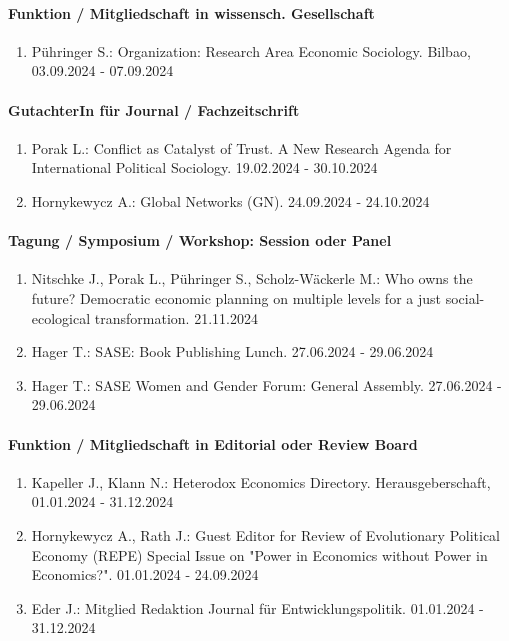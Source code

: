 \paragraph{Funktion / Mitgliedschaft in wissensch. Gesellschaft} 
\begin{enumerate}[leftmargin=*, labelsep=0.5cm] 
 	 \item Pühringer S.: Organization: Research Area Economic Sociology. Bilbao, 03.09.2024 - 07.09.2024 
\end{enumerate} 
\paragraph{GutachterIn für Journal / Fachzeitschrift} 
\begin{enumerate}[leftmargin=*, labelsep=0.5cm] 
 	 \item Porak L.: Conflict as Catalyst of Trust. A New Research Agenda for International Political Sociology. 19.02.2024 - 30.10.2024 
	 \item Hornykewycz A.: Global Networks (GN). 24.09.2024 - 24.10.2024 
\end{enumerate} 
\paragraph{Tagung / Symposium / Workshop: Session oder Panel} 
\begin{enumerate}[leftmargin=*, labelsep=0.5cm] 
 	 \item Nitschke J., Porak L., Pühringer S., Scholz-Wäckerle M.: Who owns the future? Democratic economic planning on multiple levels for a just social-ecological transformation. 21.11.2024 
	 \item Hager T.: SASE: Book Publishing Lunch. 27.06.2024 - 29.06.2024 
	 \item Hager T.: SASE Women and Gender Forum: General Assembly. 27.06.2024 - 29.06.2024 
\end{enumerate} 
\paragraph{Funktion / Mitgliedschaft in Editorial oder Review Board} 
\begin{enumerate}[leftmargin=*, labelsep=0.5cm] 
 	 \item Kapeller J., Klann N.: Heterodox Economics Directory. Herausgeberschaft, 01.01.2024 - 31.12.2024 
	 \item Hornykewycz A., Rath J.: Guest Editor for Review of Evolutionary Political Economy (REPE) Special Issue on "Power in Economics without Power in Economics?". 01.01.2024 - 24.09.2024 
	 \item Eder J.: Mitglied Redaktion Journal für Entwicklungspolitik. 01.01.2024 - 31.12.2024 
\end{enumerate} 

